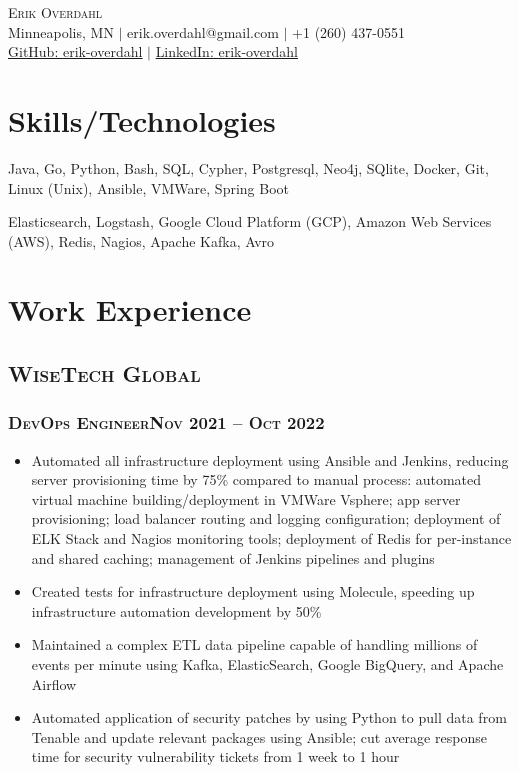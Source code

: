 \documentclass{article}
\newcommand{\resumeSection}[1]{\section*{#1}}
\newcommand{\institution}[1]{\subsection*{\scshape{#1}}}
\newcommand{\jobPosition}[3]{\subsubsection*{\scshape{#1}\hfill #2 -- #3}}
\begin{document}
\begin{center}
  {\Huge\scshape{Erik Overdahl}}
  \\\vspace{5pt}
  \normalsize{
    Minneapolis, MN
    $|$
    erik.overdahl@gmail.com
    $|$
    +1 (260) 437-0551
    \\
    \href{https://github.com/erik-overdahl}{GitHub: \underline{erik-overdahl}}
    $|$
    \href{https://linkedin.com/in/erik-overdahl}{LinkedIn: \underline{erik-overdahl}}
  }
\end{center}

\resumeSection{Skills/Technologies}
  \begin{description}[noitemsep]
      \item [Proficient]
          Java,
          Go,
          Python,
          Bash,
          SQL,
          Cypher,
          Postgresql,
          Neo4j,
          SQlite,
          Docker,
          Git,
          Linux (Unix),
          Ansible,
          VMWare,
          Spring Boot

      \item [Exposure]
          Elasticsearch,
          Logstash,
          Google Cloud Platform (GCP),
          Amazon Web Services (AWS),
          Redis,
          Nagios,
          Apache Kafka,
          Avro
  \end{description}

\resumeSection{Work Experience}

  \institution{WiseTech Global}

    \jobPosition{DevOps Engineer}{Nov 2021}{Oct 2022}
    \begin{itemize}[noitemsep]
      \item
            Automated all infrastructure deployment using Ansible and
            Jenkins, reducing server provisioning time by 75\% compared to manual
            process: automated virtual machine building/deployment in VMWare
            Vsphere; app server provisioning; load balancer routing and logging
            configuration; deployment of ELK Stack and Nagios monitoring tools;
            deployment of Redis for per-instance and shared caching; management of
            Jenkins pipelines and plugins
      \item
            Created tests for infrastructure deployment using Molecule,
            speeding up infrastructure automation development by 50\%
      \item
            Maintained a complex ETL data pipeline capable of handling
            millions of events per minute using Kafka, ElasticSearch, Google BigQuery,
            and Apache Airflow
      \item
            Automated application of security patches by using Python to
            pull data from Tenable and update relevant packages using Ansible; cut
            average response time for security vulnerability tickets from 1 week to
            1 hour
    \end{itemize}
\end{document}
